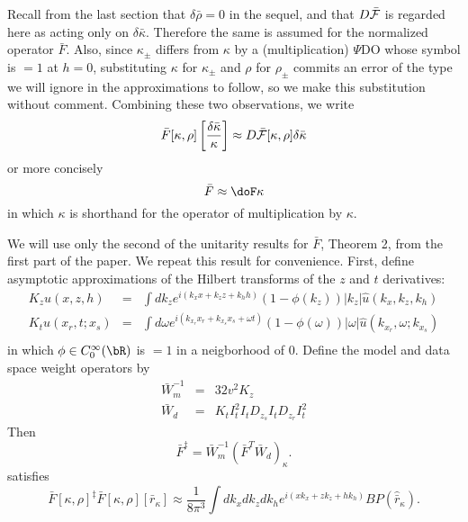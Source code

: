 Recall from the last section that $\delta \bar{\rho} = 0$ in the
sequel, and that $D\bar{\cal F}$ is regarded here as acting only on
$\delta \bar{\kappa}$. Therefore the same is assumed for the
normalized operator $\bar{F}$. Also, since $\kappa_{\pm}$ differs from
$\kappa$ by a (multiplication) $\Psi$DO whose symbol is $=1$ at $h=0$,
substituting $\kappa$ for $\kappa_{\pm}$ and $\rho$ for $\rho_{\pm}$
commits an error of the type we will ignore in the approximations to
follow, so we make this substitution without comment. Combining these
two observations, we write
\begin{equation}
\label{eqn:nondimterce}
\bar{F}[\kappa,\rho]\left[\frac{\delta \bar{\kappa}}{\kappa}\right] \approx  
D\bar{\cal F}[\kappa,\rho]\delta \bar{\kappa} 
\end{equation} 
or more concisely 
\begin{equation}
\label{eqn:nondimquatro}
\bar{F} \approx\doF \kappa
\end{equation}
in which $\kappa$ is shorthand for the operator of multiplication by $\kappa$.

We will use only the second of the unitarity results for $\bar{F}$,
Theorem 2, from the first part of the paper. We repeat this result for
convenience. First, define asymptotic approximations of the Hilbert transforms of the $z$ and $t$
derivatives:
\begin{eqnarray}
\label{eqn:kzkt1} 
K_zu(x,z,h) &=& \int dk_z e^{i(k_xx+k_z z+k_hh)}
                (1-\phi(k_z))|k_z|\hat{u}(k_x,k_z,k_h)\\
\label{eqn:kzkt3} 
K_tu(x_r,t;x_s) &=& \int d\omega e^{i(k_{x_r} x_r+k_{x_s} x_s+\omega
                    t)}
                    (1-\phi(\omega))|\omega|\hat{u}(k_{x_r},\omega;k_{x_s}) \\
\end{eqnarray}
in which $\phi \in C^{\infty}_0(\bR)$ is $=1$ in a neigborhood of
$0$. 
Define the model and data space weight operators by
\begin{eqnarray}
\label{eqn:defbarWm}
\bar{W}_m^{-1} &=& 32 v^2 K_z \\
\label{eqn:defbarWd}
\bar{W}_d & = & K_t I_t^2 I_t
D_{z_s}I_t
D_{z_r}I_t^2
\end{eqnarray}
Then
\begin{equation}
\label{eqn:defdd}
\bar{F}^{\ddagger} = \bar{W}_m^{-1}(\bar{F}^T\bar{W}_d)_{\kappa}.
\end{equation}
satisfies
\begin{equation}
\label{eqn:rk6sigmaterce}
\bar{F}[\kappa,\rho]^{\ddagger}\bar{F}[\kappa,\rho][\bar{r}_{\kappa}]
\approx  
\frac{1}{8 \pi^3}\int dk_x dk_z dk_h e^{i(xk_{x}+zk_{z}+hk_{h})}B P
 (\hat{\bar{r}}_{\kappa}) .
\end{equation}

